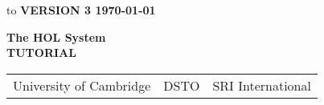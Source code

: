 

\begin{titlepage}
\null\vskip-47pt
\hbox to \textwidth
{\bf VERSION 3 { \hfil \today}}

\setcounter{page}{1}                      %

\vspace*{60mm}


\begin{center}
 {\Huge\bf The HOL System}\\[0.4cm]
{\LARGE\bf TUTORIAL}\\[2.5cm]
\end{center}


\vspace*{100mm}
\begin{center}
\begin{tabular}{ccc}
University of Cambridge & \hspace*{10ex}DSTO\hspace*{10ex} & SRI International
\end{tabular}

\end{center}

\vfill
\end{titlepage}

\thispagestyle{empty}
\mbox{}
\newpage





